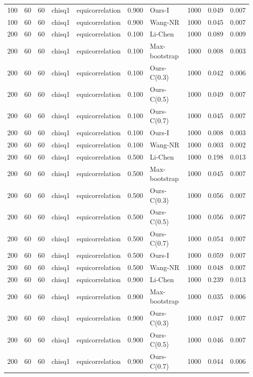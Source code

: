 \begin{tabular}{rrrllrlrrr}
100 & 60 & 60 & chisq1 & equicorrelation & 0.900 & Ours-I & 1000 & 0.049 & 0.007 \\
100 & 60 & 60 & chisq1 & equicorrelation & 0.900 & Wang-NR & 1000 & 0.045 & 0.007 \\
200 & 60 & 60 & chisq1 & equicorrelation & 0.100 & Li-Chen & 1000 & 0.089 & 0.009 \\
200 & 60 & 60 & chisq1 & equicorrelation & 0.100 & Max-bootstrap & 1000 & 0.008 & 0.003 \\
200 & 60 & 60 & chisq1 & equicorrelation & 0.100 & Ours-C(0.3) & 1000 & 0.042 & 0.006 \\
200 & 60 & 60 & chisq1 & equicorrelation & 0.100 & Ours-C(0.5) & 1000 & 0.049 & 0.007 \\
200 & 60 & 60 & chisq1 & equicorrelation & 0.100 & Ours-C(0.7) & 1000 & 0.045 & 0.007 \\
200 & 60 & 60 & chisq1 & equicorrelation & 0.100 & Ours-I & 1000 & 0.008 & 0.003 \\
200 & 60 & 60 & chisq1 & equicorrelation & 0.100 & Wang-NR & 1000 & 0.003 & 0.002 \\
200 & 60 & 60 & chisq1 & equicorrelation & 0.500 & Li-Chen & 1000 & 0.198 & 0.013 \\
200 & 60 & 60 & chisq1 & equicorrelation & 0.500 & Max-bootstrap & 1000 & 0.045 & 0.007 \\
200 & 60 & 60 & chisq1 & equicorrelation & 0.500 & Ours-C(0.3) & 1000 & 0.056 & 0.007 \\
200 & 60 & 60 & chisq1 & equicorrelation & 0.500 & Ours-C(0.5) & 1000 & 0.056 & 0.007 \\
200 & 60 & 60 & chisq1 & equicorrelation & 0.500 & Ours-C(0.7) & 1000 & 0.054 & 0.007 \\
200 & 60 & 60 & chisq1 & equicorrelation & 0.500 & Ours-I & 1000 & 0.059 & 0.007 \\
200 & 60 & 60 & chisq1 & equicorrelation & 0.500 & Wang-NR & 1000 & 0.048 & 0.007 \\
200 & 60 & 60 & chisq1 & equicorrelation & 0.900 & Li-Chen & 1000 & 0.239 & 0.013 \\
200 & 60 & 60 & chisq1 & equicorrelation & 0.900 & Max-bootstrap & 1000 & 0.035 & 0.006 \\
200 & 60 & 60 & chisq1 & equicorrelation & 0.900 & Ours-C(0.3) & 1000 & 0.047 & 0.007 \\
200 & 60 & 60 & chisq1 & equicorrelation & 0.900 & Ours-C(0.5) & 1000 & 0.046 & 0.007 \\
200 & 60 & 60 & chisq1 & equicorrelation & 0.900 & Ours-C(0.7) & 1000 & 0.044 & 0.006 \\

\end{tabular}
